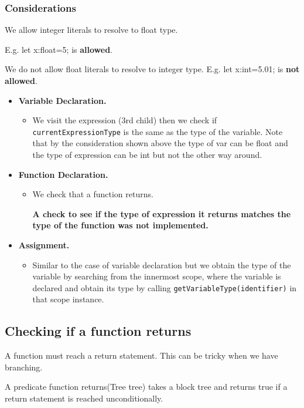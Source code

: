 \subsubsection{Considerations}
We allow integer literals to resolve to float type. 

E.g. let x:float=5; is \textbf{allowed}.

We do not allow float literals to resolve to integer type. E.g. let x:int=5.01; is \textbf{not allowed}.


\begin{itemize}
    \item \textbf{Variable Declaration.}
    \begin{itemize}
        \item We visit the expression (3rd child) then we check if \verb!currentExpressionType! is the same as the type of the variable. Note that by the consideration  shown above the type of var can be float and the type of expression can be int but not the other way around.
    \end{itemize}
    \item \textbf{Function Declaration.}
    \begin{itemize}
        \item We check that a function returns.
        
        
     \textbf{A check to see if the type of expression it returns matches the type of the function was not implemented.}
    \end{itemize}
    \item \textbf{Assignment.}
    \begin{itemize}
        \item Similar to the case of variable declaration but we obtain the type of the variable by searching from the innermost scope, where the variable is declared and obtain its type by calling \verb!getVariableType(identifier)! in that scope instance.
    \end{itemize}

\end{itemize}






\subsection{Checking if a function returns}
A function must reach a return statement. This can be tricky when we have branching.

A predicate function returns(Tree tree) takes a block tree and returns true if a return statement is reached unconditionally.

